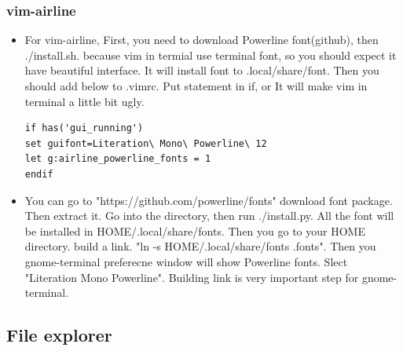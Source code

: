 \documentclass[a4paper,12pt,twoside]{book}
\begin{document}
\subsubsection{vim-airline} 
\begin{itemize}

\item For vim-airline,  First, you need to download Powerline font(github), then ./install.sh. because vim in termial use terminal font, so you should expect it have beautiful interface. It will install font to .local/share/font. Then you should add below to .vimrc.  Put statement in if, or It will make vim in terminal a little bit ugly. 

\begin{verbatim}
if has('gui_running')
set guifont=Literation\ Mono\ Powerline\ 12   
let g:airline_powerline_fonts = 1
endif
\end{verbatim}

\item You can go to "https://github.com/powerline/fonts" download font package. Then extract it. Go into the directory, then run ./install.py.  All the font will be installed in HOME/.local/share/fonts. Then you go to your HOME directory. build a link. "ln -s HOME/.local/share/fonts .fonts". Then you gnome-terminal preferecne window will show Powerline fonts. Slect "Literation Mono Powerline". Building link is very important step for gnome-terminal. 

\end{itemize}

\subsection{File explorer}
\end{document}
